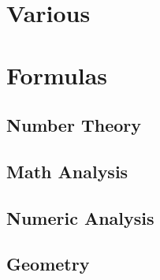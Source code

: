 \chapter{Various}




\chapter{Formulas}

\section{Number Theory}




\section{Math Analysis}


\section{Numeric Analysis}



\section{Geometry}


